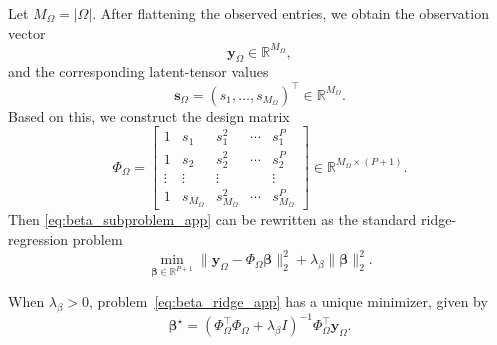 Let $M_\Omega=|\Omega|$. After flattening the observed entries, we obtain the observation vector
\begin{equation}
\mathbf y_\Omega\in\mathbb R^{M_\Omega},
\end{equation}
and the corresponding latent-tensor values
\begin{equation}
\mathbf s_\Omega=(s_1,\dots,s_{M_\Omega})^\top\in\mathbb R^{M_\Omega}.
\end{equation}
Based on this, we construct the design matrix
\begin{equation}
\Phi_\Omega=
\begin{bmatrix}
1 & s_1 & s_1^2 & \cdots & s_1^P\\
1 & s_2 & s_2^2 & \cdots & s_2^P\\
\vdots & \vdots & \vdots & & \vdots\\
1 & s_{M_\Omega} & s_{M_\Omega}^2 & \cdots & s_{M_\Omega}^P
\end{bmatrix}
\in\mathbb R^{M_\Omega\times(P+1)}.
\label{eq:PhiOmega_app_def}
\end{equation}
Then \eqref{eq:beta_subproblem_app} can be rewritten as the standard ridge-regression problem
\begin{equation}
\min_{\boldsymbol\beta\in\mathbb R^{P+1}}
\|\mathbf y_\Omega - \Phi_\Omega \boldsymbol\beta\|_2^2
+
\lambda_\beta \|\boldsymbol\beta\|_2^2.
\label{eq:beta_ridge_app}
\end{equation}

\begin{proposition}
\label{prop:beta_unique_app}
When $\lambda_\beta>0$, problem~\eqref{eq:beta_ridge_app} has a unique minimizer, given by
\begin{equation}
\boldsymbol\beta^\star
=
\left(\Phi_\Omega^\top \Phi_\Omega+\lambda_\beta I\right)^{-1}
\Phi_\Omega^\top \mathbf y_\Omega.
\label{eq:beta_closed_form_app}
\end{equation}
\end{proposition}


